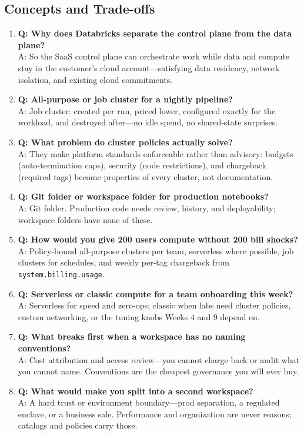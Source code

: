\subsection{Concepts and Trade-offs}
\begin{enumerate}
    \item \textbf{Q: Why does Databricks separate the control plane from the data plane?}\\
    A: So the SaaS control plane can orchestrate work while data and compute stay in the customer's cloud account---satisfying data residency, network isolation, and existing cloud commitments.
    \item \textbf{Q: All-purpose or job cluster for a nightly pipeline?}\\
    A: Job cluster: created per run, priced lower, configured exactly for the workload, and destroyed after---no idle spend, no shared-state surprises.
    \item \textbf{Q: What problem do cluster policies actually solve?}\\
    A: They make platform standards enforceable rather than advisory: budgets (auto-termination caps), security (node restrictions), and chargeback (required tags) become properties of every cluster, not documentation.
    \item \textbf{Q: Git folder or workspace folder for production notebooks?}\\
    A: Git folder. Production code needs review, history, and deployability; workspace folders have none of these.
    \item \textbf{Q: How would you give 200 users compute without 200 bill shocks?}\\
    A: Policy-bound all-purpose clusters per team, serverless where possible, job clusters for schedules, and weekly per-tag chargeback from \texttt{system.billing.usage}.
    \item \textbf{Q: Serverless or classic compute for a team onboarding this week?}\\
    A: Serverless for speed and zero-ops; classic when labs need cluster policies, custom networking, or the tuning knobs Weeks 4 and 9 depend on.
    \item \textbf{Q: What breaks first when a workspace has no naming conventions?}\\
    A: Cost attribution and access review---you cannot charge back or audit what you cannot name. Conventions are the cheapest governance you will ever buy.
    \item \textbf{Q: What would make you split into a second workspace?}\\
    A: A hard trust or environment boundary---prod separation, a regulated enclave, or a business sale. Performance and organization are never reasons; catalogs and policies carry those.
\end{enumerate}

